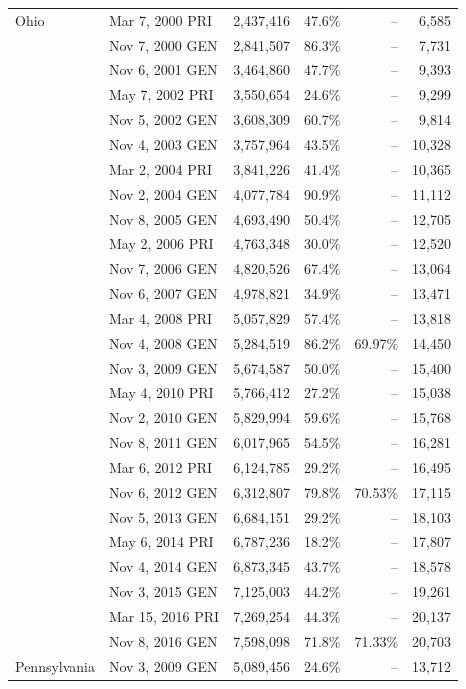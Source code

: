 \begin{longtable}{llrrrr}
Ohio & Mar 7, 2000 PRI & 2,437,416 & 47.6\% & -- & 6,585 \\
 & Nov 7, 2000 GEN & 2,841,507 & 86.3\% & -- & 7,731 \\
 & Nov 6, 2001 GEN & 3,464,860 & 47.7\% & -- & 9,393 \\
 & May 7, 2002 PRI & 3,550,654 & 24.6\% & -- & 9,299 \\
 & Nov 5, 2002 GEN & 3,608,309 & 60.7\% & -- & 9,814 \\
 & Nov 4, 2003 GEN & 3,757,964 & 43.5\% & -- & 10,328 \\
 & Mar 2, 2004 PRI & 3,841,226 & 41.4\% & -- & 10,365 \\
 & Nov 2, 2004 GEN & 4,077,784 & 90.9\% & -- & 11,112 \\
 & Nov 8, 2005 GEN & 4,693,490 & 50.4\% & -- & 12,705 \\
 & May 2, 2006 PRI & 4,763,348 & 30.0\% & -- & 12,520 \\
 & Nov 7, 2006 GEN & 4,820,526 & 67.4\% & -- & 13,064 \\
 & Nov 6, 2007 GEN & 4,978,821 & 34.9\% & -- & 13,471 \\
 & Mar 4, 2008 PRI & 5,057,829 & 57.4\% & -- & 13,818 \\
 & Nov 4, 2008 GEN & 5,284,519 & 86.2\% & 69.97\% & 14,450 \\
 & Nov 3, 2009 GEN & 5,674,587 & 50.0\% & -- & 15,400 \\
 & May 4, 2010 PRI & 5,766,412 & 27.2\% & -- & 15,038 \\
 & Nov 2, 2010 GEN & 5,829,994 & 59.6\% & -- & 15,768 \\
 & Nov 8, 2011 GEN & 6,017,965 & 54.5\% & -- & 16,281 \\
 & Mar 6, 2012 PRI & 6,124,785 & 29.2\% & -- & 16,495 \\
 & Nov 6, 2012 GEN & 6,312,807 & 79.8\% & 70.53\% & 17,115 \\
 & Nov 5, 2013 GEN & 6,684,151 & 29.2\% & -- & 18,103 \\
 & May 6, 2014 PRI & 6,787,236 & 18.2\% & -- & 17,807 \\
 & Nov 4, 2014 GEN & 6,873,345 & 43.7\% & -- & 18,578 \\
 & Nov 3, 2015 GEN & 7,125,003 & 44.2\% & -- & 19,261 \\
 & Mar 15, 2016 PRI & 7,269,254 & 44.3\% & -- & 20,137 \\
 & Nov 8, 2016 GEN & 7,598,098 & 71.8\% & 71.33\% & 20,703 \\
Pennsylvania & Nov 3, 2009 GEN & 5,089,456 & 24.6\% & -- & 13,712 \\

\end{longtable}
